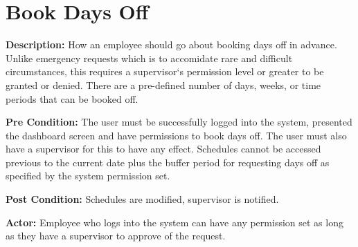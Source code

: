 \documentclass[letterpaper,12pt]{report}
\begin{document}
\section{Book Days Off}
\begin{description}
 \item \textbf{Description:} \newline How an employee should go about booking days off in advance. Unlike emergency requests which is to accomidate rare and difficult circumstances, this requires a supervisor`s permission level or greater to be granted or denied. There are a pre-defined number of days, weeks, or time periods that can be booked off.
 \item \textbf{Pre Condition:} \newline The user must be successfully logged into the system, presented the dashboard screen and have permissions to book days off. The user must also have a supervisor for this to have any effect. Schedules cannot be accessed previous to the current date plus the buffer period for requesting days off as specified by the system permission set.
 \item \textbf{Post Condition:} \newline Schedules are modified, supervisor is notified.
 \item \textbf{Actor:} \newline Employee who logs into the system can have any permission set as long as they have a supervisor to approve of the request.
\end{description}
\end{document}
